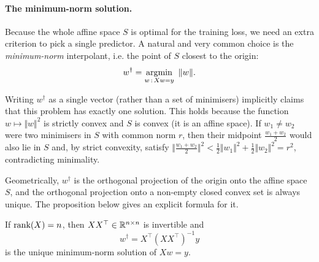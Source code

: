 \paragraph{The minimum-norm solution.}
Because the whole affine space $S$ is optimal for the training loss, we need an
extra criterion to pick a single predictor. A natural and very common choice is
the \emph{minimum-norm} interpolant, i.e. the point of $S$ closest to the origin:
\[
w^\dagger = \operatorname*{argmin}_{w \,:\, Xw = y} \ \Vert w \Vert .
\]

\begin{remark}
Writing $w^\dagger$ as a single vector (rather than a set of minimisers) implicitly claims that this problem has exactly one solution. This holds because the function $w \mapsto \Vert w \Vert^2$ is strictly convex and $S$ is convex (it is an affine space). If $w_1 \neq w_2$ were two minimisers in $S$ with common norm $r$, then their midpoint $\tfrac{w_1 + w_2}{2}$ would also lie in $S$ and, by strict convexity, satisfy $\Vert \tfrac{w_1 + w_2}{2} \Vert^2 < \tfrac12 \Vert w_1 \Vert^2 + \tfrac12 \Vert w_2 \Vert^2 = r^2$, contradicting minimality.

Geometrically, $w^\dagger$ is the orthogonal projection of the origin onto the affine space $S$, and the orthogonal projection onto a non-empty closed convex set is always unique. The proposition below gives an explicit formula for it.
\end{remark}

\begin{prop}
If $\operatorname{rank}(X) = n$, then $XX^\top \in \mathbb{R}^{n \times n}$ is invertible and
\[
w^\dagger = X^\top (XX^\top)^{-1} y
\]
is the unique minimum-norm solution of $Xw = y$.
\end{prop}

